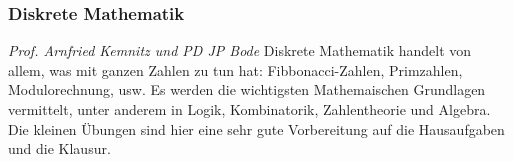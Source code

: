 
\subsubsection{Diskrete Mathematik}
	\textit{Prof. Arnfried Kemnitz und PD JP Bode}
	Diskrete Mathematik handelt von allem, was mit ganzen Zahlen zu tun hat: Fibbonacci-Zahlen, Primzahlen, Modulorechnung, usw. Es werden die wichtigsten Mathemaischen Grundlagen vermittelt, unter anderem in Logik, Kombinatorik, Zahlentheorie und Algebra. Die kleinen Übungen sind hier eine sehr gute Vorbereitung auf die Hausaufgaben und die Klausur.